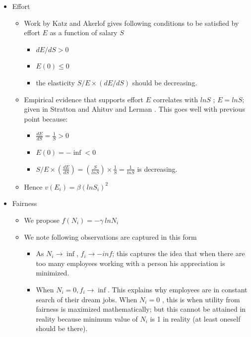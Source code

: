 \documentclass[letterpaper,english,10pt]{article}
\begin{document}
\begin{itemize}
\begin{itemize}
   \end{itemize}
\item Effort 
   \begin{itemize}
    \item  Work by Katz \cite{katz} and Akerlof \cite{akerlof} gives following conditions to be satisfied by effort $E$ as a function of salary $S$
    \begin{itemize}
        \item $dE/dS >0$
        \item $E(0) \leq 0 $
        \item the elasticity $S/E \times (dE/dS)$ should be decreasing.
    \end{itemize}
    \item Empirical evidence that supports effort $E$ correlates with $lnS$ ; $E= lnS$; given in Stratton \cite{stratton} and Ahituv and Lerman \cite{ahituv}. This goes well with previous point because: \\
     \begin{itemize}
     \item $\frac{dE}{dS} = \frac{1}{S} >0$
     \item $E(0) = -\inf < 0$
     \item $S/E \times (\frac{dE}{dS}) = (\frac{S}{ln S}) \times \frac{1}{S} = \frac{1}{ln S} $ is decreasing.
     \end{itemize}
     \item Hence $v(E_i) = \beta (ln S_i)^2$
   \end{itemize}
   \item Fairness 
        \begin{itemize}
        \item We propose $f(N_i) = -\gamma~ ln N_i$
        \item We note following observations are captured in this form
           \begin{itemize}
               \item As $N_i \to \inf $, $f_i \to -inf$; this captures the idea that when there are too many employees working with a person his appreciation is minimized.
               \item When $N_i = 0, f_i \to \inf. $ This explains why employees are in constant search of their dream jobs. When $N_i=0$ , this is when utility from fairness is maximized mathematically; but this cannot be attained in reality because minimum value of $N_i$ is 1 in reality (at least  oneself should be there).
           \end{itemize}
        \end{itemize}
   
\end{itemize}
\end{document}
